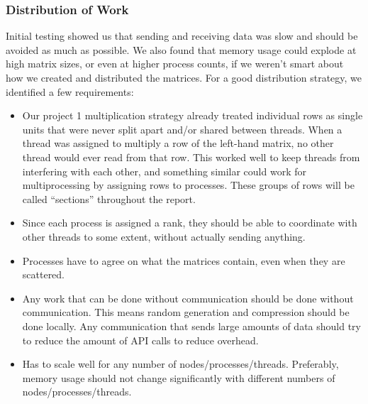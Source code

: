 \documentclass[11pt,leqno]{article}
\begin{document}
\begin{flushleft}
\subsubsection{Distribution of Work}\label{distribution-of-work}

Initial testing showed us that sending and receiving data was slow and
should be avoided as much as possible. We also found that memory usage
could explode at high matrix sizes, or even at higher process counts, if
we weren't smart about how we created and distributed the matrices. For
a good distribution strategy, we identified a few requirements: \\[2 ex]
\begin{itemize}[label=\textcolor{CtpMauve}{\textbullet}]

\item  Our project 1 multiplication strategy already treated individual rows as single units that were never split apart and/or shared between threads. When a thread was assigned to multiply a row of the left-hand matrix, no other thread would ever read from that row. This worked well to keep threads from interfering with each other, and something similar could work for multiprocessing by assigning rows to processes. These groups of rows will be called ``sections'' throughout the report.\newline

\item Since each process is assigned a rank, they should be able to coordinate with other threads to some extent, without actually sending anything.

\item Processes have to agree on what the matrices contain, even when they are scattered.\newline

\item Any work that can be done without communication should be done without communication. This means random generation and compression should be done locally. Any communication that sends large amounts of data should try to reduce the amount of API calls to reduce overhead.\newline

\item Has to scale well for any number of nodes/processes/threads. Preferably, memory usage should not change significantly with different numbers of nodes/processes/threads.\newline

\end{itemize}


\end{flushleft}
\end{document}
